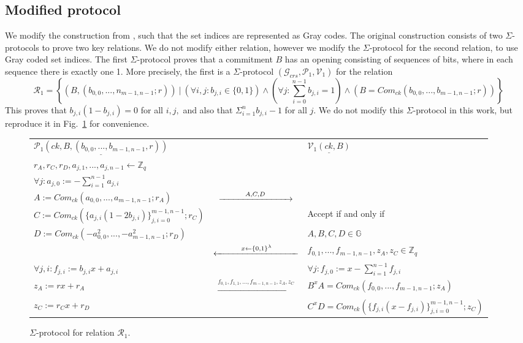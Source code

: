 \documentclass{article}
\begin{document}
\subsection{Modified protocol}
We modify the construction from \cite{bootle}, such that the set indices are represented as Gray codes. The original construction consists of two $\Sigma$-protocols to prove two key relations. We do not modify either relation, however we modify the $\Sigma$-protocol for the second relation, to use Gray coded set indices.
The first $\Sigma$-protocol proves that a commitment $B$ has an opening consisting of sequences of bits, where in each sequence there is exactly one 1. More precisely, the first is a $\Sigma$-protocol $(\mathcal{G}_{crs}, \mathcal{P}_1, \mathcal{V}_1)$ for the relation
$$\mathcal{R}_1 = \left\{(B, (b_{0,0},...,n_{m-1,n-1};r))\ |\ (\forall{i,j}: b_{j,i} \in \{0,1\}) \land (\forall{j}: \sum_{i=0}^{n-1}b_{j,i} = 1) \land (B = Com_{ck}(b_{0,0},...,b_{m-1,n-1};r)) \right\}$$
This proves that $b_{j,i}(1 - b_{j,i}) = 0$ for all $i,j,$ and also that $\Sigma_{i=1}^n b_{j,i} - 1$ for all $j$. We do not modify this $\Sigma$-protocol in this work, but reproduce it in Fig.~\ref{fig:sp-for-r1} for convenience.

\begin{figure}[H]
    \centering
    \begin{tabular}{| l c l |}
    \hline
        $\underline{\mathcal{P}_1(ck,B,(b_{0,0},...,b_{m-1,n-1},r))}$ & & $\underline{\mathcal{V}_1(ck,B)}$ \\
        $r_A,r_C,r_D,a_{j,1},...,a_{j,n-1} \leftarrow{} \mathbb{Z}_q$ & & \\
        $\forall{j}: a_{j,0} := -\sum_{i=1}^{n-1} a_{j,i}$ & & \\
        $A := Com_{ck}(a_{0,0},...,a_{m-1,n-1};r_A)$ & $\xrightarrow{\hspace*{1cm}A,C,D\hspace*{1cm}}$ & \\
        $C := Com_{ck}(\{a_{j,i}(1-2b_{j,i})\}_{j,i=0}^{m-1,n-1};r_C)$ & & Accept if and only if \\
        $D := Com_{ck}(-a^2_{0,0},...,-a^2_{m-1,n-1};r_D)$ & & $A,B,C,D \in \mathbb{G}$ \\
         & $\xleftarrow{\hspace*{1cm}x\leftarrow\{0,1\}^\lambda\hspace*{1cm}}$ & $f_{0,1},...,f_{m-1,n-1},z_A,z_C \in \mathbb{Z}_q$ \\
        $\forall{j,i}: f_{j,i} := b_{j,i}x+a_{j,i}$ & & $\forall{j}: f_{j,0} := x-\sum_{i=1}^{n-1}f_{j,i}$ \\
        $z_A := rx + r_A$ & $\xrightarrow{f_{0,1},f_{1,1},...,f_{m-1,n-1},z_A,z_C}$ & $B^xA = Com_{ck}(f_{0,0},...,f_{m-1,n-1};z_A)$ \\
        $z_C := r_Cx + r_D$ & & $C^xD = Com_{ck}(\{f_{j,i}(x-f_{j,i})\}_{j,i=0}^{m-1,n-1};z_C)$ \\ 
    \hline
    \end{tabular}
    \caption{$\Sigma$-protocol for relation $\mathcal{R}_1$.}
    \label{fig:sp-for-r1}
\end{figure}
\end{document}
